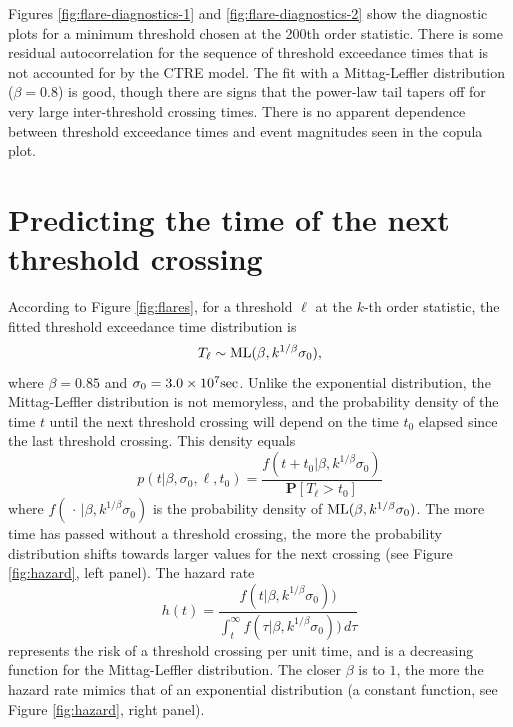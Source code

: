 \documentclass[smallextended]{svjour3}       %
\begin{document}
Figures \ref{fig:flare-diagnostics-1} and \ref{fig:flare-diagnostics-2}
show the diagnostic plots for a minimum threshold chosen at the 200th
order statistic. There is some residual autocorrelation for the sequence
of threshold exceedance times that is not accounted for by the CTRE
model. The fit with a Mittag-Leffler distribution (\(\beta = 0.8\)) is
good, though there are signs that the power-law tail tapers off for very
large inter-threshold crossing times. There is no apparent dependence
between threshold exceedance times and event magnitudes seen in the
copula plot.

\section{Predicting the time of the next threshold
crossing}\label{predicting-the-time-of-the-next-threshold-crossing}

According to Figure \ref{fig:flares}, for a threshold \(\ell\) at the
\(k\)-th order statistic, the fitted threshold exceedance time
distribution is \[
T_\ell \sim {\rm ML}(\beta, k^{1/\beta} \sigma_0), 
\] where \(\beta = 0.85\) and \(\sigma_0 = 3.0 \times 10^7 {\rm sec}\).
Unlike the exponential distribution, the Mittag-Leffler distribution is
not memoryless, and the probability density of the time \(t\) until the
next threshold crossing will depend on the time \(t_0\) elapsed since
the last threshold crossing. This density equals \[
p(t|\beta, \sigma_0, \ell, t_0) = \frac{f(t + t_0 | \beta, k^{1/\beta} \sigma_0)}{\mathbf P[T_\ell > t_0]}
\] where \(f(\,\cdot\, | \beta, k^{1/\beta} \sigma_0)\) is the
probability density of \({\rm ML}(\beta, k^{1/\beta} \sigma_0)\). The
more time has passed without a threshold crossing, the more the
probability distribution shifts towards larger values for the next
crossing (see Figure \ref{fig:hazard}, left panel). The hazard rate \[
h(t) = \frac{f(t| \beta, k^{1/\beta} \sigma_0))}{\int_t^\infty f(\tau| \beta, k^{1/\beta} \sigma_0))\,d\tau}
\] represents the risk of a threshold crossing per unit time, and is a
decreasing function for the Mittag-Leffler distribution. The closer
\(\beta\) is to \(1\), the more the hazard rate mimics that of an
exponential distribution (a constant function, see Figure
\ref{fig:hazard}, right panel).
\end{document}
